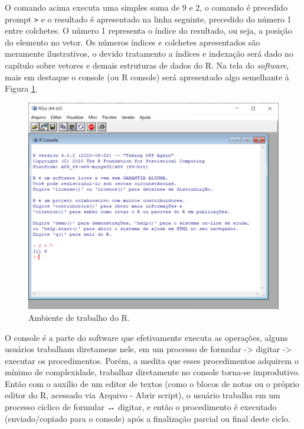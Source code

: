 \documentclass[
  11pt,
  a5paper,
  openany]{book}
\begin{document}
O comando acima executa uma simples soma de 9 e 2, o comando é precedido prompt \texttt{\textgreater{}} e o resultado é apresentado na linha seguinte, precedido do número 1 entre colchetes. O número 1 representa o índice do resultado, ou seja, a posição do elemento no vetor. Os números índices e colchetes apresentados são meramente ilustrativos, o devido tratamento a índices e indexação será dado no capítulo sobre vetores e demais estruturas de dados do R. Na tela do \emph{software}, mais em destaque o console (ou R console) será apresentado algo semelhante à Figura \ref{fig:FigRpadrao}.

\begin{figure}

{\centering \includegraphics[width=1\linewidth]{images/Fig_R_padrao} 

}

\caption{Ambiente de trabalho do R.}\label{fig:FigRpadrao}
\end{figure}

O console é a parte do software que efetivamente executa as operações, alguns usuários trabalham diretamene nele, em um processo de formular -\textgreater{} digitar -\textgreater{} executar os procedimentos. Porém, a medita que esses procedimentos adquirem o mínimo de complexidade, trabalhar diretamente no console torna-se improdutivo. Então com o auxílio de um editor de textos (como o blocos de notas ou o próprio editor do R, acessado via Arquivo - Abrir script), o usuário trabalha em um processo cíclico de formular ↔ digitar, e então o procedimento é executado (enviado/copiado para o console) após a finalização parcial ou final deste ciclo.
\end{document}
